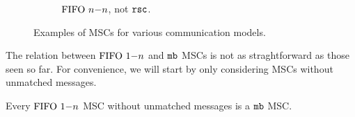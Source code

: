 \begin{figure}[t]
\begin{subfigure}[t]{0.2\textwidth}
	\caption{$\text{FIFO } n\mathsf{-}n$, not $\mathtt{rsc}$.}
	\label{fig:nn_no_rsc}
\end{subfigure}
\caption{Examples of MSCs for various communication models.}\label{fig:exmscs_2}
\end{figure}

The relation between $\text{FIFO } 1\mathsf{-}n$ and $\mathtt{mb}$ MSCs is not as straghtforward as those seen so far. For convenience, we will start by only considering MSCs without unmatched messages. 

\begin{proposition} \label{prop:onen_mb_no_unmatched}
	Every $\text{FIFO } 1\mathsf{-}n$ MSC without unmatched messages is a $\mathtt{mb}$ MSC.
\end{proposition}
